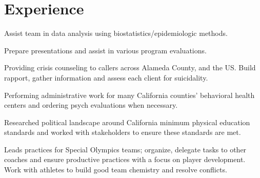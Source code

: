 \documentclass[]{deedy-resume-openfont}
\begin{document}
\begin{minipage}[t]{0.66\textwidth} 


\section{Experience}

\vspace{\topsep}
\begin{tightemize}
\item Assist team in data analysis using biostatistics/epidemiologic methods.
\item Prepare presentations and assist in various program evaluations.
\end{tightemize}
\sectionsep

\begin{tightemize}
\item Providing crisis counseling to callers across Alameda County, and the US. Build rapport, gather information and assess each client for suicidality.
\item Performing administrative work for many California counties' behavioral health centers and ordering psych evaluations when necessary.
\end{tightemize}
\sectionsep

\begin{tightemize}
\item Researched political landscape around California minimum physical education standards and worked with stakeholders to ensure these standards are met.
\end{tightemize}
\sectionsep

\begin{tightemize}
\item Leads practices for Special Olympics teams; organize, delegate tasks to other coaches and ensure productive practices with a focus on player development. Work with athletes to build good team chemistry and resolve conflicts.
\end{tightemize}
\sectionsep


\end{minipage}
\end{document}
